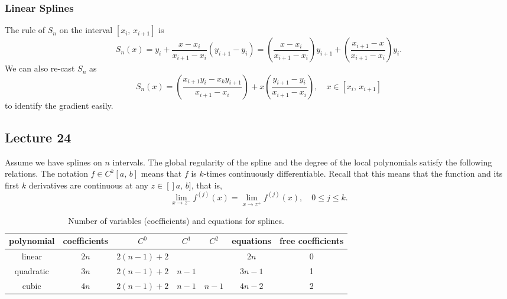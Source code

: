 \documentclass{article}
\begin{document}
\subsubsection{Linear Splines}
The rule of $S_n$ on the interval $[x_i,\,x_{i+1}]$ is
\begin{equation}
    S_n(x) = y_i + \frac{x-x_i}{x_{i+1}-x_i}(y_{i+1}-y_i) = \left(\frac{x-x_i}{x_{i+1}-x_i}\right)y_{i+1} + \left(\frac{x_{i+1}-x}{x_{i+1}-x_i}\right)y_i. \nonumber
\end{equation}
We can also re-cast $S_n$ as
\begin{equation}
    S_n(x) = \left(\frac{x_{i+1}y_i - x_ky_{i+1}}{x_{i+1}-x_i}\right) + x\left(\frac{y_{i+1}-y_i}{x_{i+1}-x_i}\right),\quad x\in [x_i,\,x_{i+1}]
\end{equation}
to identify the gradient easily.

\subsection{Lecture 24}
Assume we have splines on $n$ intervals. The global regularity of the spline and the degree of the local polynomials satisfy the following relations. The notation $f\in C^k[a,\,b]$ means that $f$ is $k$-times continuously differentiable. Recall that this means that the function and its first $k$ derivatives are continuous at any $z\in[]a,\,b]$, that is,
\begin{equation}
    \lim_{x\to z^-}f^{(j)}(x) = \lim_{x\to z^+}f^{(j)}(x),\quad 0\leq j \leq k. \nonumber
\end{equation}
\begin{table}[h!]
\centering
    \begin{tabular}{|c|c|c|c|c|c|c|}
        \hline
        polynomial & coefficients & $C^0$ & $C^1$ & $C^2$ & equations & free coefficients \\
        \hline
        linear & $2n$ & $2(n-1)+2$ &  &  & $2n$ & 0 \\
        \hline
        quadratic & $3n$ & $2(n-1)+2$ & $n-1$ &  & $3n-1$ & 1 \\
        \hline
        cubic & $4n$ & $2(n-1)+2$ & $n-1$ & $n-1$ & $4n-2$ & 2 \\
        \hline
    \end{tabular}
    \caption{Number of variables (coefficients) and equations for splines.}
    \label{table:splines}
\end{table}
\end{document}
